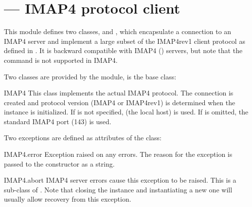 \section{ ---
         IMAP4 protocol client}




This module defines two classes,  and , which encapsulate a
connection to an IMAP4 server and implement a large subset of the
IMAP4rev1 client protocol as defined in . It is backward
compatible with IMAP4 () servers, but note that the
 command is not supported in IMAP4.

Two classes are provided by the  module,  is the base class:

\begin{classdesc}{IMAP4}{}
This class implements the actual IMAP4 protocol.  The connection is
created and protocol version (IMAP4 or IMAP4rev1) is determined when
the instance is initialized.
If  is not specified,  (the local host) is used.
If  is omitted, the standard IMAP4 port (143) is used.
\end{classdesc}

Two exceptions are defined as attributes of the  class:

\begin{excdesc}{IMAP4.error}
Exception raised on any errors.  The reason for the exception is
passed to the constructor as a string.
\end{excdesc}

\begin{excdesc}{IMAP4.abort}
IMAP4 server errors cause this exception to be raised.  This is a
sub-class of .  Note that closing the instance
and instantiating a new one will usually allow recovery from this
exception.
\end{excdesc}

